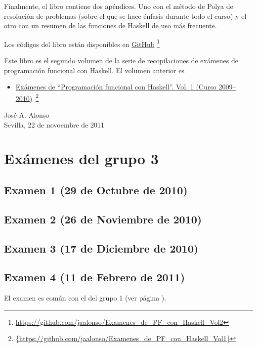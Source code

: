 \documentclass[a4paper,12pt,twoside]{book}
\begin{document}
Finalmente, el libro contiene dos apéndices. Uno con el método de Polya
de resolución de problemas (sobre el que se hace énfasis durante todo el
curso) y el otro con un resumen de las funciones de Haskell de uso más
frecuente.

Los códigos del libro están disponibles en
\href{https://github.com/jaalonso/Examenes_de_PF_con_Haskell_Vol2}
     {GitHub}
     \footnote{{\url{https://github.com/jaalonso/Examenes_de_PF_con_Haskell_Vol2}}}

Este libro es el segundo volumen de la serie de recopilaciones de
exámenes de programación funcional con Haskell. El volumen anterior es
\begin{itemize}
\item
  \href{https://github.com/jaalonso/Examenes_de_PF_con_Haskell_Vol1}
  {Exámenes de ``Programaci\'on funcional con Haskell''.
    Vol. 1 (Curso 2009--2010)}\
    \footnote{\url{{https://github.com/jaalonso/Examenes_de_PF_con_Haskell_Vol1}}}

\end{itemize}
     
\begin{flushright}
  José A. Alonso \\
  Sevilla, 22 de novoembre de 2011
\end{flushright}

\chapter{Exámenes del grupo 3}

\section{Examen 1 (29 de Octubre de 2010)}
\section{Examen 2 (26 de Noviembre de 2010)}
\section{Examen 3 (17 de Diciembre de 2010)}
\section{Examen 4 (11 de Febrero de 2011)}
El examen es común con el del grupo 1 (ver página \pageref{examen_10_11_4_4}).
\end{document}
